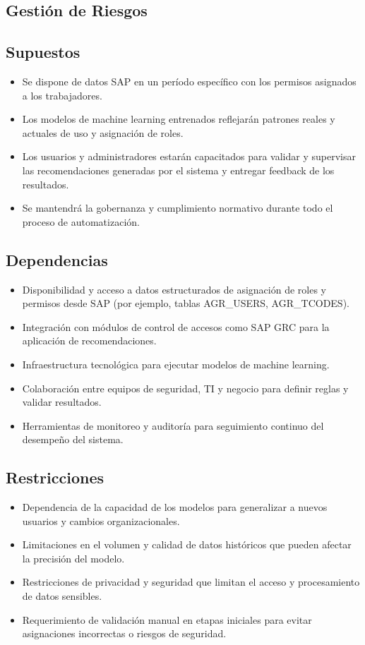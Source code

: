 \documentclass[11pt,letterpaper]{article}
\begin{document}
\begin{itemize}
\section{Gestión de Riesgos}

\subsection{Supuestos}
\begin{itemize}
    \item Se dispone de datos SAP en un período específico con los permisos asignados a los trabajadores.
    \item Los modelos de machine learning entrenados reflejarán patrones reales y actuales de uso y asignación de roles.
    \item Los usuarios y administradores estarán capacitados para validar y supervisar las recomendaciones generadas por el sistema y entregar feedback de los resultados.
    \item Se mantendrá la gobernanza y cumplimiento normativo durante todo el proceso de automatización.
\end{itemize}

\subsection{Dependencias}
\begin{itemize}
    \item Disponibilidad y acceso a datos estructurados de asignación de roles y permisos desde SAP (por ejemplo, tablas AGR\_USERS, AGR\_TCODES).
    \item Integración con módulos de control de accesos como SAP GRC para la aplicación de recomendaciones.
    \item Infraestructura tecnológica para ejecutar modelos de machine learning.
    \item Colaboración entre equipos de seguridad, TI y negocio para definir reglas y validar resultados.
    \item Herramientas de monitoreo y auditoría para seguimiento continuo del desempeño del sistema.
\end{itemize}

\subsection{Restricciones}
\begin{itemize}
    \item Dependencia de la capacidad de los modelos para generalizar a nuevos usuarios y cambios organizacionales.
    \item Limitaciones en el volumen y calidad de datos históricos que pueden afectar la precisión del modelo.
    \item Restricciones de privacidad y seguridad que limitan el acceso y procesamiento de datos sensibles.
    \item Requerimiento de validación manual en etapas iniciales para evitar asignaciones incorrectas o riesgos de seguridad.
\end{itemize}


\end{itemize}
\end{document}
